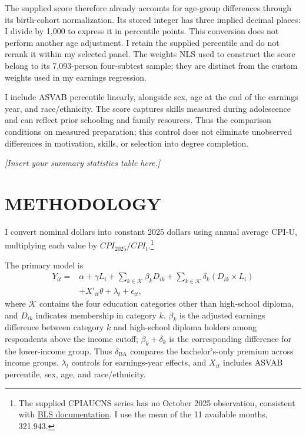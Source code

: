 \documentclass[12pt,letterpaper]{article}
\begin{document}
The supplied score therefore already accounts for age-group differences through
its birth-cohort normalization. Its stored integer has three implied decimal
places: I divide by 1,000 to express it in percentile points. This conversion
does not perform another age adjustment. I retain the supplied percentile and
do not rerank it within my selected panel. The weights NLS used to construct
the score belong to its 7,093-person four-subtest sample; they are distinct from
the custom weights used in my earnings regression.

I include ASVAB percentile linearly, alongside sex, age at the end of the
earnings year, and race/ethnicity. The score captures skills measured during
adolescence and can reflect prior schooling and family resources. Thus the
comparison conditions on measured preparation; this control does not eliminate
unobserved differences in motivation, skills, or selection into degree completion.

\textit{[Insert your summary statistics table here.]}

\section*{METHODOLOGY}
I convert nominal dollars into constant 2025 dollars using annual average CPI-U,
multiplying each value by $CPI_{2025}/CPI_t$.\footnote{The supplied CPIAUCNS series
has no October 2025 observation, consistent with
\href{https://www.bls.gov/news.release/archives/cpi_12182025.htm}{BLS documentation}.
I use the mean of the 11 available months, 321.943.}

The primary model is
\[
\begin{aligned}
    Y_{it}={}&\alpha+\gamma L_i+\sum_{k\in\mathcal K}\beta_k D_{ik}
              +\sum_{k\in\mathcal K}\delta_k(D_{ik}\times L_i)\\
             &+X'_{it}\theta+\lambda_t+\epsilon_{it},
\end{aligned}
\]
where $\mathcal K$ contains the four education categories other than high-school
diploma, and $D_{ik}$ indicates membership in category $k$. $\beta_k$ is the adjusted
earnings difference between category $k$ and high-school diploma holders among
respondents above the income cutoff; $\beta_k+\delta_k$ is the corresponding
difference for the lower-income group. Thus $\delta_{\mathrm{BA}}$ compares the
bachelor's-only premium across income groups. $\lambda_t$ controls for earnings-year
effects, and $X_{it}$ includes ASVAB percentile, sex, age, and race/ethnicity.
\end{document}
